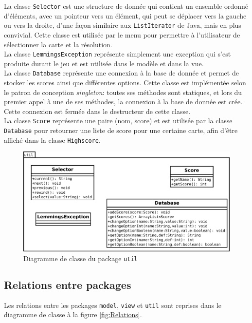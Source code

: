 \documentclass[a4paper,12pt]{article}
\begin{document}
La classe \texttt{Selector} est une structure de donnée qui contient
un ensemble ordonné d'éléments, avec un pointeur vers un élément, qui
peut se déplacer vers la gauche ou vers la droite, d'une façon
similaire aux \texttt{ListIterator} de Java, mais en plus
convivial. Cette classe est utilisée par le menu pour permettre à
l'utilisateur de sélectionner la carte et la résolution.\\

La classe \texttt{LemmingsException} représente simplement une
exception qui s'est produite durant le jeu et est utilisée dans le
modèle et dans la vue.\\

La classe \texttt{Database} représente une connexion à la base de
donnée et permet de stocker les scores ainsi que différentes
options. Cette classe est implémentée selon le patron de conception
\emph{singleton}: toutes ses méthodes sont statiques, et lors du
premier appel à une de ses méthodes, la connexion à la base de donnée
est crée. Cette connexion est fermée dans le destructeur de cette
classe.\\

La classe \texttt{Score} représente une paire (nom, score) et est
utilisée par la classe \texttt{Database} pour retourner une liste de
score pour une certaine carte, afin d'être affiché dans la classe
\texttt{Highscore}.

\begin{figure}[ht!]
  \centerline{
  \includegraphics[width=\textwidth]{util.png}}
  \caption{Diagramme de classe du package \texttt{util}}
\end{figure}

\subsection{Relations entre packages}
Les relations entre les packages \texttt{model}, \texttt{view} et
\texttt{util} sont reprises dans le diagramme de classe à la figure
\ref{fig:Relations}.
\end{document}

